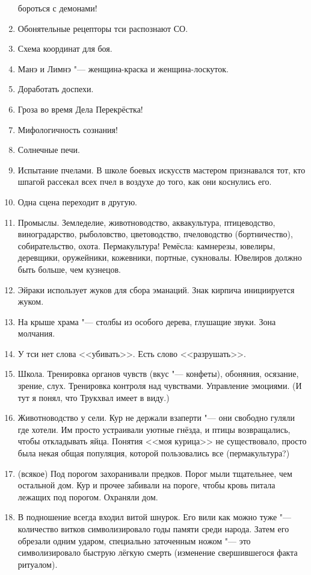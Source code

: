 \documentclass[a4paper,10pt]{book}
\begin{document}
\begin{enumerate}
бороться с демонами!
\item Обонятельные рецепторы тси распознают СО.
\item Схема координат для боя.
\item Манэ и Лимнэ "--- женщина-краска и женщина-лоскуток.
\item Доработать доспехи.
\item Гроза во время Дела Перекрёстка!
\item Мифологичность сознания!
\item Солнечные печи.
\item Испытание пчелами. В школе боевых искусств мастером признавался тот, кто 
шпагой рассекал всех пчел в воздухе до того, как они коснулись его.
\item Одна сцена переходит в другую.
\item Промыслы. Земледелие, животноводство, аквакультура, птицеводство, 
виноградарство, рыболовство, цветоводство, пчеловодство (бортничество), 
собирательство, охота. Пермакультура! Ремёсла: камнерезы, ювелиры, деревщики, 
оружейники,
кожевники,
портные,
сукновалы.
Ювелиров должно быть больше, чем кузнецов.
\item Эйраки использует жуков для сбора эманаций. Знак кирпича инициируется 
жуком.
\item На крыше храма "--- столбы из особого дерева, глушащие звуки. Зона 
молчания.
\item У тси нет слова <<убивать>>. Есть слово <<разрушать>>.
\item Школа. Тренировка органов чувств (вкус "--- конфеты), обоняния, осязание, 
зрение, слух. Тренировка контроля над чувствами. Управление эмоциями. (И тут я 
понял, что Трукхвал имеет в виду.)
\item Животноводство у сели. Кур не держали взаперти "--- они свободно гуляли 
где хотели. Им просто устраивали уютные гнёзда, и птицы возвращались, чтобы 
откладывать яйца. Понятия <<моя курица>> не существовало, просто была некая 
общая популяция, которой пользовались все (пермакультура?)
\item (всякое) Под порогом захоранивали предков. Порог мыли тщательнее, чем 
остальной дом. Кур и прочее забивали на пороге, чтобы кровь питала лежащих под 
порогом. Охраняли дом.
\item В подношение всегда входил витой шнурок. Его вили как можно туже "--- 
количество витков символизировало годы памяти среди народа. Затем его обрезали 
одним ударом, специально заточенным ножом "--- это символизировало быструю 
лёгкую смерть (изменение свершившегося факта ритуалом).

\end{enumerate}
\end{document}
